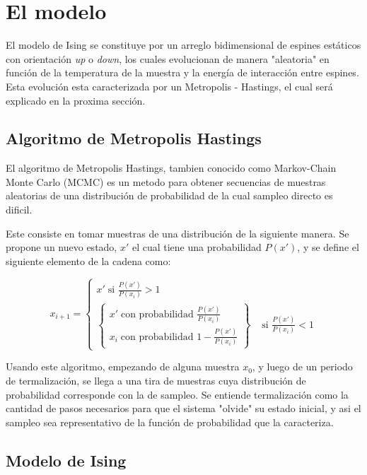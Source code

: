 \documentclass[
 reprint,
 amsmath,amssymb,
 aps,
]{revtex4-1}
\begin{document}
\section{El modelo}

El modelo de Ising se constituye por un arreglo bidimensional de espines
est\'aticos con orientaci\'on \textit{up} o \textit{down}, los cuales
evolucionan de manera "aleatoria" en funci\'on de la temperatura de la muestra
y la energ\'ia de interacci\'on entre espines. Esta evoluci\'on esta
caracterizada por un Metropolis - Hastings, el cual ser\'a explicado en la
proxima secci\'on.

\subsection{Algoritmo de Metropolis Hastings}

El algoritmo de Metropolis Hastings, tambien conocido como Markov-Chain
Monte Carlo (MCMC) es un metodo para obtener secuencias de muestras aleatorias
de una distribuci\'on de probabilidad de la cual sampleo directo es dificil.

Este consiste en tomar muestras de una distribuci\'on de la siguiente manera.
Se propone un nuevo estado, $x'$ el cual tiene una probabilidad $P(x')$, y se
define el siguiente elemento de la cadena como:

$$
x_{i + 1} = \left \{
\begin{matrix}
  x' \; \text{si } \frac{P(x')}{P(x_i)} > 1 \\
  \left \{ \begin{matrix}
    x' \; \text{con probabilidad }\frac{P(x')}{P(x_i)} \\
    x_i \; \text{con probabilidad }1 - \frac{P(x')}{P(x_i)}
\end{matrix}
  \right \}
 \;\;\;\; \text{si } \frac{P(x')}{P(x_i)} < 1
\end{matrix}   \right.
$$

Usando este algoritmo, empezando de alguna muestra $x_0$, y luego de un periodo
de termalizaci\'on, se llega a una tira de muestras cuya distribuci\'on de
probabilidad corresponde con la de sampleo. Se entiende termalizaci\'on como la
cantidad de pasos necesarios para que el sistema "olvide" su estado inicial, y
asi el sampleo sea representativo de la funci\'on de probabilidad que la caracteriza.

\subsection{Modelo de Ising}
\end{document}
